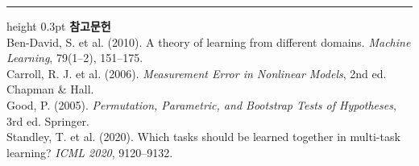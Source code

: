 \documentclass[10pt]{article}
\begin{document}
\vspace{0.6em}
\hrule height 0.3pt
\vspace{0.5em}
{\footnotesize
\textbf{참고문헌}\\[0.3em]
Ben-David, S. et al. (2010). A theory of learning from different domains.
\emph{Machine Learning}, 79(1--2), 151--175.\\[0.15em]
Carroll, R. J. et al. (2006). \emph{Measurement Error in Nonlinear Models},
2nd ed. Chapman \& Hall.\\[0.15em]
Good, P. (2005). \emph{Permutation, Parametric, and Bootstrap Tests of Hypotheses},
3rd ed. Springer.\\[0.15em]
Standley, T. et al. (2020). Which tasks should be learned together in multi-task
learning? \emph{ICML 2020}, 9120--9132.
}
\end{document}
